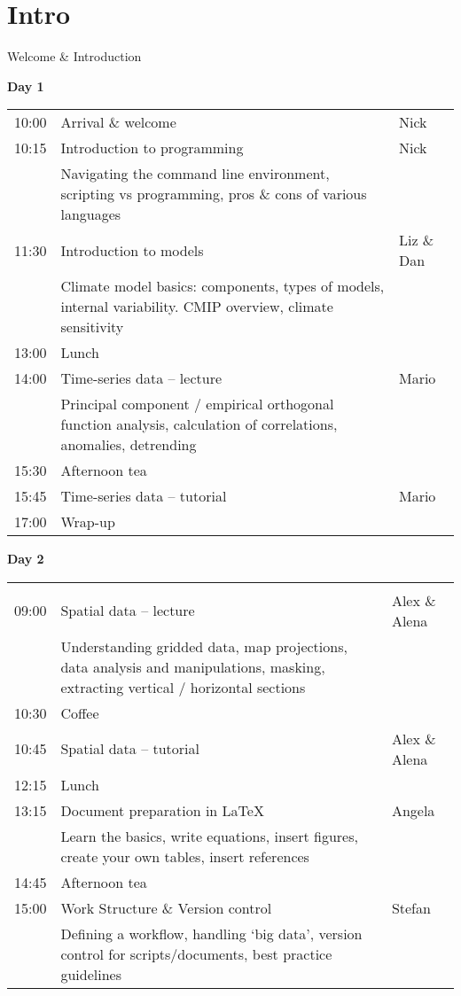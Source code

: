 

\section{Intro}
\begin{frame}{\insertsectionnumber{ |} Welcome \& Introduction}

\hspace*{-0.5cm}\textbf{Day 1} \\
\begin{tabular}{p{0.75cm}|p{7.5cm}|p{1.75cm}}
\hline 
10:00 & Arrival \& welcome & Nick \\
10:15 & Introduction to programming & Nick \\
& \tiny{Navigating the command line environment, scripting vs programming, pros \& cons of various languages} & \\
11:30 & Introduction to models & Liz \& Dan \\
& \tiny{Climate model basics: components, types of models, internal variability. CMIP overview, climate sensitivity} & \\
13:00 & Lunch &  \\
14:00 & Time-series data -- lecture & Mario \\
& \tiny{Principal component / empirical orthogonal function analysis, calculation of correlations, anomalies, detrending} & \\
15:30 & Afternoon tea &  \\
15:45 & Time-series data -- tutorial & Mario \\
17:00 & Wrap-up & \\
\hline
\end{tabular}


\hspace*{-0.5cm}\textbf{Day 2} \\
\begin{tabular}{p{0.75cm}|p{7.5cm}|p{1.75cm}}
\hline\\09:00 & Spatial data -- lecture & Alex \& Alena \\
& \tiny{Understanding gridded data, map projections, data analysis and manipulations, masking, extracting vertical / horizontal sections} & \\
10:30 & Coffee & \\
10:45 & Spatial data -- tutorial & Alex \& Alena \\
12:15 & Lunch & \\
13:15 & Document preparation in \LaTeX & Angela \\
& \tiny{Learn the basics, write equations, insert figures, create your own tables, insert references} & \\
14:45 & Afternoon tea &  \\
15:00 & Work Structure \& Version control & Stefan \\
& \tiny{Defining a workflow, handling `big data', version control for scripts/documents, best practice guidelines} & \\
\hline
\end{tabular}


\end{frame}

